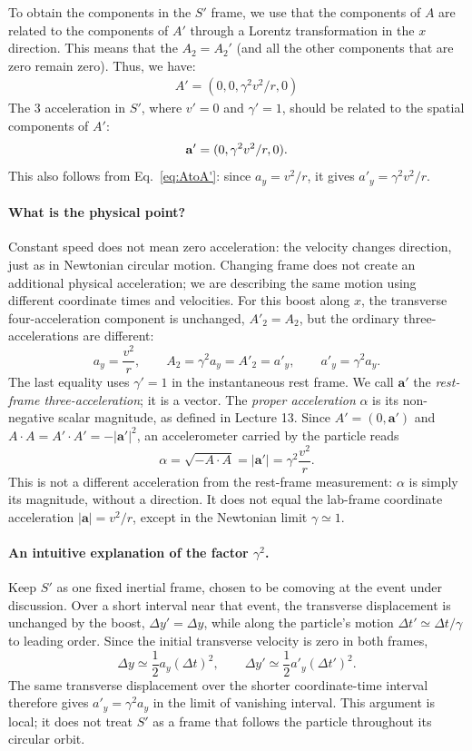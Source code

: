 \documentclass[12pt]{article}
\newcommand{\be}{\begin{eqnarray}}
\newcommand{\ee}{\end{eqnarray}}
\begin{document}
To obtain the components in the $S'$ frame, we use that the components of $A$ are related to the components of $A'$ through a Lorentz transformation in the $x$ direction. This means that the $A_2 = A_2'$ (and all the other components that are zero remain zero). Thus, we have:
\be
A' = (0,0,\gamma^2 v^2/r,0)
\ee
The 3 acceleration in $S'$, where $v'=0$ and $\gamma' = 1$, should be related to the spatial components of $A'$:
\be
{\bf a}' = (0,\gamma^2 v^2/r,0).
\ee
This also follows from Eq.~\eqref{eq:AtoA'}: since $a_y=v^2/r$, it gives
$a'_y=\gamma^2v^2/r$.

\paragraph{What is the physical point?}
Constant speed does not mean zero acceleration: the velocity changes direction, just as in Newtonian circular motion. Changing frame does not create an additional physical acceleration; we are describing the same motion using different coordinate times and velocities. For this boost along $x$, the transverse four-acceleration component is unchanged, $A'_2=A_2$, but the ordinary three-accelerations are different:
\[
a_y=\frac{v^2}{r},\qquad
A_2=\gamma^2a_y=A'_2=a'_y,\qquad
\boxed{a'_y=\gamma^2a_y.}
\]
The last equality uses $\gamma'=1$ in the instantaneous rest frame. We call $\mathbf a'$ the \emph{rest-frame three-acceleration}; it is a vector. The \emph{proper acceleration} $\alpha$ is its non-negative scalar magnitude, as defined in Lecture 13. Since $A'=(0,\mathbf a')$ and $A\cdot A=A'\cdot A'=-|\mathbf a'|^2$, an accelerometer carried by the particle reads
\[
\boxed{\alpha=\sqrt{-A\cdot A}=|\mathbf a'|=\gamma^2\frac{v^2}{r}.}
\]
This is not a different acceleration from the rest-frame measurement: $\alpha$ is simply its magnitude, without a direction. It does not equal the lab-frame coordinate acceleration $|\mathbf a|=v^2/r$, except in the Newtonian limit $\gamma\simeq1$.

\paragraph{An intuitive explanation of the factor $\gamma^2$.}
Keep $S'$ as one fixed inertial frame, chosen to be comoving at the event under discussion. Over a short interval near that event, the transverse displacement is unchanged by the boost, $\Delta y'=\Delta y$, while along the particle's motion $\Delta t'\simeq\Delta t/\gamma$ to leading order. Since the initial transverse velocity is zero in both frames,
\[
\Delta y\simeq\frac12a_y(\Delta t)^2,\qquad
\Delta y'\simeq\frac12a'_y(\Delta t')^2.
\]
The same transverse displacement over the shorter coordinate-time interval therefore gives $a'_y=\gamma^2a_y$ in the limit of vanishing interval. This argument is local; it does not treat $S'$ as a frame that follows the particle throughout its circular orbit.
\end{document}
